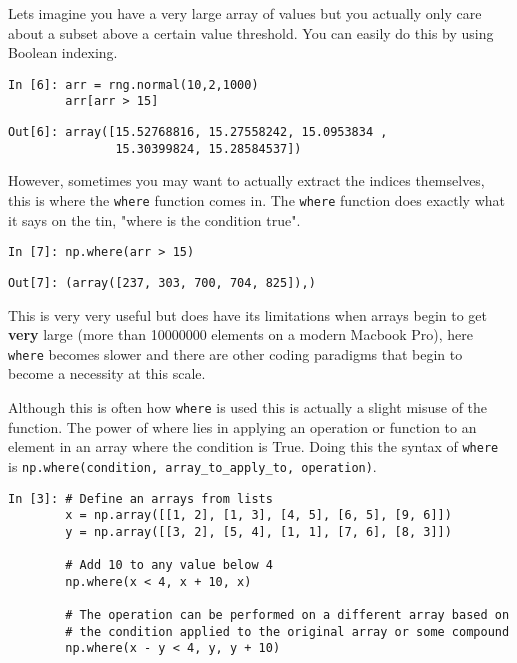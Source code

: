 Lets imagine you have a very large array of values but you actually only care about a subset above a certain value threshold. You can easily do this by using Boolean indexing.

\begin{lstlisting}[style=PY]
In [6]: arr = rng.normal(10,2,1000)
        arr[arr > 15]
\end{lstlisting}
\begin{lstlisting}[style=PY, backgroundcolor=\color{white}]
Out[6]: array([15.52768816, 15.27558242, 15.0953834 , 
               15.30399824, 15.28584537])
\end{lstlisting}

However, sometimes you may want to actually extract the indices themselves, this is where the \texttt{where} function comes in. The \texttt{where} function does exactly what it says on the tin, "where is the condition true".

\begin{lstlisting}[style=PY]
In [7]: np.where(arr > 15)
\end{lstlisting}
\begin{lstlisting}[style=PY, backgroundcolor=\color{white}]
Out[7]: (array([237, 303, 700, 704, 825]),)
\end{lstlisting}

This is very very useful but does have its limitations when arrays begin to get \textbf{very} large (more than 10000000 elements on a modern Macbook Pro), here \texttt{where} becomes slower and there are other coding paradigms that begin to become a necessity at this scale.

Although this is often how \texttt{where} is used this is actually a slight misuse of the function. The power of where lies in applying an operation or function to an element in an array where the condition is True. Doing this the syntax of \texttt{where} is \texttt{np.where(condition, array\_to\_apply\_to, operation)}.
\begin{lstlisting}[style=PY]
In [3]: # Define an arrays from lists
        x = np.array([[1, 2], [1, 3], [4, 5], [6, 5], [9, 6]])
        y = np.array([[3, 2], [5, 4], [1, 1], [7, 6], [8, 3]])
        
        # Add 10 to any value below 4
        np.where(x < 4, x + 10, x)
        
        # The operation can be performed on a different array based on
        # the condition applied to the original array or some compound
        np.where(x - y < 4, y, y + 10)
\end{lstlisting}

